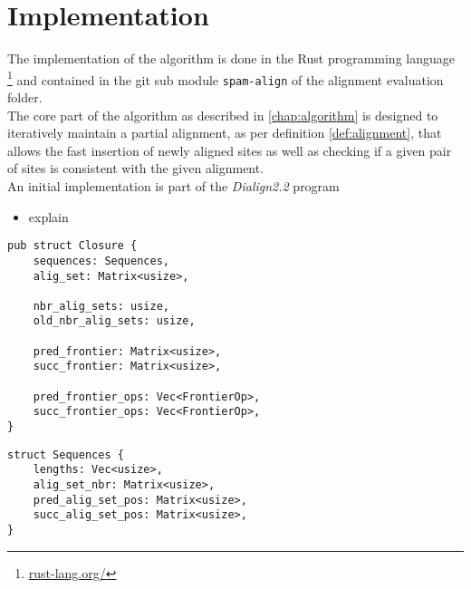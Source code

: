 \chapter{Implementation}
The implementation of the algorithm is done in the Rust programming language \footnote{\href{rust-lang.org/}{rust-lang.org/}} and contained in the git sub module \texttt{spam-align} of the alignment evaluation folder.\\


The core part of the algorithm as described in \ref{chap:algorithm} is designed to iteratively maintain a partial alignment, as per definition \ref{def:alignment}, that allows the fast insertion of newly aligned sites as well as checking if a given pair of sites is consistent with the given alignment.\\
An initial implementation is part of the \textit{Dialign2.2} program
\begin{itemize}
	\item explain 
\end{itemize}

\begin{multicols}{2}
\begin{verbatim}
pub struct Closure {
	sequences: Sequences,
	alig_set: Matrix<usize>,
	
	nbr_alig_sets: usize,
	old_nbr_alig_sets: usize,
	
	pred_frontier: Matrix<usize>,
	succ_frontier: Matrix<usize>,
	
	pred_frontier_ops: Vec<FrontierOp>,
	succ_frontier_ops: Vec<FrontierOp>,
}
\end{verbatim}

\begin{verbatim}
struct Sequences {
	lengths: Vec<usize>,
	alig_set_nbr: Matrix<usize>,
	pred_alig_set_pos: Matrix<usize>,
	succ_alig_set_pos: Matrix<usize>,
}
\end{verbatim}
	
\end{multicols}
